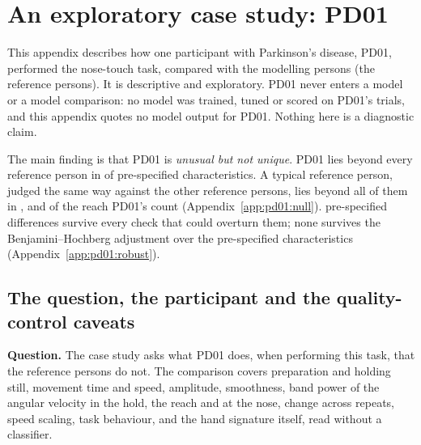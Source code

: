 \section{An exploratory case study: PD01}\label{app:pd01}

This appendix describes how one participant with Parkinson's disease, PD01, performed the nose-touch task, compared with the  modelling persons (the reference persons).
It is descriptive and exploratory.
PD01 never enters a model or a model comparison: no model was trained, tuned or scored on PD01's trials, and this appendix quotes no model output for PD01.
Nothing here is a diagnostic claim.

The main finding is that PD01 is \emph{unusual but not unique}.
PD01 lies beyond every reference person in  of  pre-specified characteristics.
A typical reference person, judged the same way against the other reference persons, lies beyond all of them in , and  of the  reach PD01's count (Appendix~\ref{app:pd01:null}).
 pre-specified differences survive every check that could overturn them; none survives the Benjamini--Hochberg adjustment over the pre-specified characteristics (Appendix~\ref{app:pd01:robust}).

\subsection{The question, the participant and the quality-control caveats}\label{app:pd01:question}

\textbf{Question.}
The case study asks what PD01 does, when performing this task, that the reference persons do not.
The comparison covers preparation and holding still, movement time and speed, amplitude, smoothness, band power of the angular velocity in the hold, the reach and at the nose, change across repeats, speed scaling, task behaviour, and the hand signature itself, read without a classifier.

